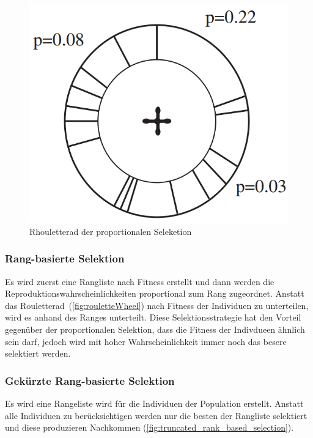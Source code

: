         \begin{figure}[H]
          \includegraphics[scale=0.4, center]{graphics/roulettewheel}
          \caption[\protect{}, S.24]{Rhouletterad der proportionalen Seleketion\label{fig:rouletteWheel}}
        \end{figure}

      \subsubsection{Rang-basierte Selektion}

        Es wird zuerst eine Rangliste nach Fitness erstellt und dann werden die Reproduktionswahrscheinlichkeiten proportional zum Rang zugeordnet.
        Anstatt das Rouletterad~(\vref{fig:rouletteWheel}) nach Fitness der Individuen zu unterteilen, wird es anhand des Ranges unterteilt.
        Diese Selektionsstrategie hat den Vorteil gegenüber der proportionalen Selektion,
        dass die Fitness der Indivdueen ähnlich sein darf, jedoch wird mit hoher Wahrscheinlichkeit immer noch das besere selektiert werden.

      \subsubsection{Gekürzte Rang-basierte Selektion}

        Es wird eine Rangeliste wird für die Individuen der Population erstellt.
        Anstatt alle Individuen zu berücksichtigen werden nur die besten der Rangliste selektiert und diese produzieren Nachkommen (\vref{fig:truncated_rank_based_selection}).

